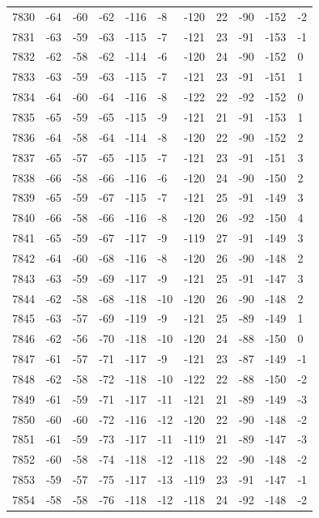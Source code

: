 \begin{table}[H]
\begin{tabular}{lllllllllll}
7830 & -64 & -60 & -62 & -116 & -8 & -120 & 22 & -90 & -152 & -2 \\
7831 & -63 & -59 & -63 & -115 & -7 & -121 & 23 & -91 & -153 & -1 \\
7832 & -62 & -58 & -62 & -114 & -6 & -120 & 24 & -90 & -152 & 0 \\
7833 & -63 & -59 & -63 & -115 & -7 & -121 & 23 & -91 & -151 & 1 \\
7834 & -64 & -60 & -64 & -116 & -8 & -122 & 22 & -92 & -152 & 0 \\
7835 & -65 & -59 & -65 & -115 & -9 & -121 & 21 & -91 & -153 & 1 \\
7836 & -64 & -58 & -64 & -114 & -8 & -120 & 22 & -90 & -152 & 2 \\
7837 & -65 & -57 & -65 & -115 & -7 & -121 & 23 & -91 & -151 & 3 \\
7838 & -66 & -58 & -66 & -116 & -6 & -120 & 24 & -90 & -150 & 2 \\
7839 & -65 & -59 & -67 & -115 & -7 & -121 & 25 & -91 & -149 & 3 \\
7840 & -66 & -58 & -66 & -116 & -8 & -120 & 26 & -92 & -150 & 4 \\
7841 & -65 & -59 & -67 & -117 & -9 & -119 & 27 & -91 & -149 & 3 \\
7842 & -64 & -60 & -68 & -116 & -8 & -120 & 26 & -90 & -148 & 2 \\
7843 & -63 & -59 & -69 & -117 & -9 & -121 & 25 & -91 & -147 & 3 \\
7844 & -62 & -58 & -68 & -118 & -10 & -120 & 26 & -90 & -148 & 2 \\
7845 & -63 & -57 & -69 & -119 & -9 & -121 & 25 & -89 & -149 & 1 \\
7846 & -62 & -56 & -70 & -118 & -10 & -120 & 24 & -88 & -150 & 0 \\
7847 & -61 & -57 & -71 & -117 & -9 & -121 & 23 & -87 & -149 & -1 \\
7848 & -62 & -58 & -72 & -118 & -10 & -122 & 22 & -88 & -150 & -2 \\
7849 & -61 & -59 & -71 & -117 & -11 & -121 & 21 & -89 & -149 & -3 \\
7850 & -60 & -60 & -72 & -116 & -12 & -120 & 22 & -90 & -148 & -2 \\
7851 & -61 & -59 & -73 & -117 & -11 & -119 & 21 & -89 & -147 & -3 \\
7852 & -60 & -58 & -74 & -118 & -12 & -118 & 22 & -90 & -148 & -2 \\
7853 & -59 & -57 & -75 & -117 & -13 & -119 & 23 & -91 & -147 & -1 \\
7854 & -58 & -58 & -76 & -118 & -12 & -118 & 24 & -92 & -148 & -2 \\

\end{tabular}
\end{table}
